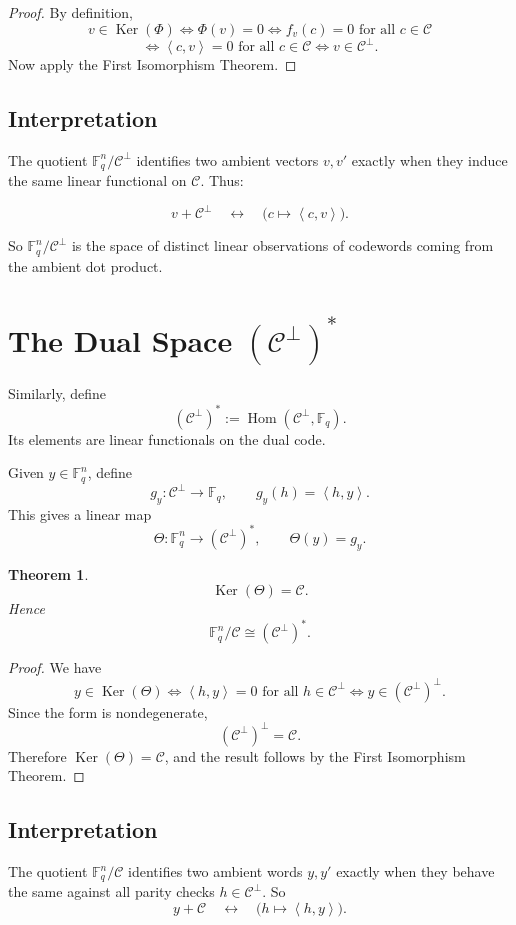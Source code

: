 \documentclass[11pt]{article}
\newtheorem{theorem}{Theorem}
\theoremstyle{remark}
\newcommand{\F}{\mathbb{F}}
\newcommand{\C}{\mathcal{C}}
\newcommand{\Cp}{\mathcal{C}^{\perp}}
\newcommand{\ip}[2]{\left\langle #1,#2\right\rangle}
\newcommand{\Hom}{\operatorname{Hom}}
\newcommand{\Ker}{\operatorname{Ker}}
\begin{document}
	\begin{proof}
		By definition,
		\[
		v\in \Ker(\Phi)
		\iff \Phi(v)=0
		\iff f_v(c)=0 \text{ for all } c\in \C
		\]
		\[
		\iff \ip{c}{v}=0 \text{ for all } c\in \C
		\iff v\in \Cp.
		\]
		Now apply the First Isomorphism Theorem.
	\end{proof}
	
	\subsection{Interpretation}
	
	The quotient \(\F_q^n/\Cp\) identifies two ambient vectors \(v,v'\) exactly when they induce the same linear functional on \(\C\). Thus:
	
	\[
	v+\Cp
	\quad\leftrightarrow\quad
	\big(c\mapsto \ip{c}{v}\big).
	\]
	
	So \(\F_q^n/\Cp\) is the space of distinct linear observations of codewords coming from the ambient dot product.
	
	\section{The Dual Space \((\C^\perp)^*\)}
	
	Similarly, define
	\[
	(\Cp)^* := \Hom(\Cp,\F_q).
	\]
	Its elements are linear functionals on the dual code.
	
	Given \(y\in \F_q^n\), define
	\[
	g_y:\Cp\to \F_q,\qquad g_y(h)=\ip{h}{y}.
	\]
	This gives a linear map
	\[
	\Theta:\F_q^n\to (\Cp)^*,\qquad \Theta(y)=g_y.
	\]
	
	\begin{theorem}
		\[
		\Ker(\Theta)=\C.
		\]
		Hence
		\[
		\F_q^n/\C \cong (\Cp)^*.
		\]
	\end{theorem}
	
	\begin{proof}
		We have
		\[
		y\in \Ker(\Theta)
		\iff \ip{h}{y}=0 \text{ for all } h\in \Cp
		\iff y\in (\Cp)^\perp.
		\]
		Since the form is nondegenerate,
		\[
		(\Cp)^\perp=\C.
		\]
		Therefore \(\Ker(\Theta)=\C\), and the result follows by the First Isomorphism Theorem.
	\end{proof}
	
	\subsection{Interpretation}
	
	The quotient \(\F_q^n/\C\) identifies two ambient words \(y,y'\) exactly when they behave the same against all parity checks \(h\in\Cp\). So
	\[
	y+\C
	\quad\leftrightarrow\quad
	\big(h\mapsto \ip{h}{y}\big).
	\]
	
\end{document}
